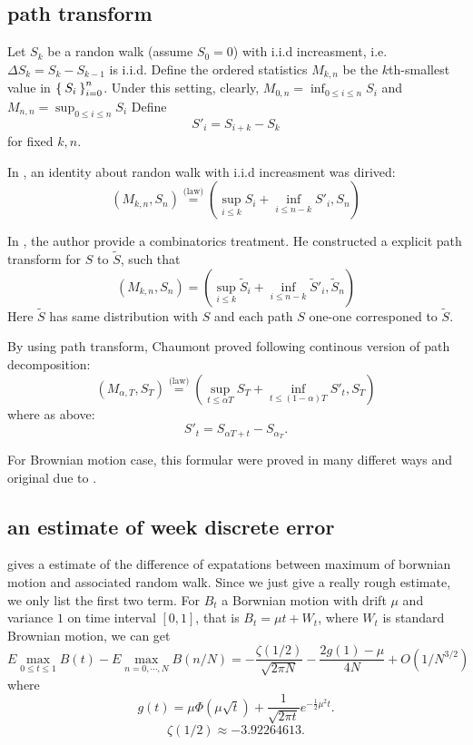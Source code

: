 \documentclass[11pt]{book}
\def\eqlaw{{\stackrel{\text{(law)}}{=}}}
\def\tS{{\widetilde{S}}}
\begin{document}
\subsection{path transform}
Let $S_k$ be a randon walk (assume $S_0=0$)
with i.i.d increasment, i.e.
$\Delta S_k = S_k -  S_{k-1}$ is i.i.d.
Define the ordered statistics $M_{k,n}$ be the $k$th-smallest value in
$\Set{S_i}_{i=0}^n$.
Under this setting, clearly, $M_{0,n} = \inf_{0\leq i\leq n}S_i$
and $M_{n,n} = \sup_{0\leq i\leq n}S_i$
Define
\[S'_i = S_{i+k}-S_k\]
for fixed $k, n$.

In \cite{Wendel1960}, an identity about randon walk with
i.i.d increasment was dirived:
\begin{equation}\label{eq:dpathdec}
(M_{k,n}, S_n) \eqlaw (\sup_{i\leq k} S_i +\inf_{i\leq n-k} S'_i, S_n)
\end{equation}

In \cite{Chaumont1999}, the author provide a combinatorics treatment.
He constructed a explicit path transform for $S$ to $\tS$, such that
\[
(M_{k,n}, S_n) = (\sup_{i\leq k} \tS_i+\inf_{i\leq n-k} \tS'_i, \tS_n)
\]
Here $\tS$ has same distribution with $S$ and each path $S$
 one-one corresponed to $\tS$.

By using path transform, Chaumont proved
following continous version of path decomposition:
\begin{equation}\label{eq:cpathdec}
(M_{\alpha,T}, S_T) \eqlaw (\sup_{t\leq \alpha{T}} S_T +\inf_{t \leq (1-\alpha)T} S'_t, S_T)
\end{equation}
where as above:
\[
S'_t = S_{\alpha T+t} - S_{\alpha_T}.
\]

For Brownian motion case, this formular were proved in many differet ways
and original due to \cite{Dassios1995}.

\subsection{an estimate of week discrete error}
\cite{Janssen2008} gives a estimate of the difference of  expatations
between maximum of borwnian motion and associated random walk.
Since we just give a really rough estimate, we only list the first two term.
For $B_t$ a Borwnian motion with drift $\mu$ and variance $1$ on time interval $[0,1]$, that is $B_t = \mu t + W_t$, where $W_t$ is standard Brownian motion, we can get
\begin{equation}\label{eq:est1}
E\max_{0\leq t \leq 1} B(t) - E\max_{n=0,\cdots, N}B(n/N)
= -\frac{\zeta(1/2)}{\sqrt{2\pi N}}-\frac{2g(1)-\mu}{4N} + O(1/N^{3/2})
\end{equation}
where
\[
g(t) = \mu \Phi(\mu \sqrt{t}) + \frac{1}{\sqrt{2\pi t}} e^{-\frac{1}{2}\mu^2 t}.
\]
\[
\zeta(1/2) \approx -3.92264613.
\]
\end{document}

